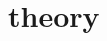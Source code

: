 \documentclass[xcolor=dvipsnames]{beamer}
\begin{document}

\section{\safeBtoXsgamma theory}

   
  
\end{document}
